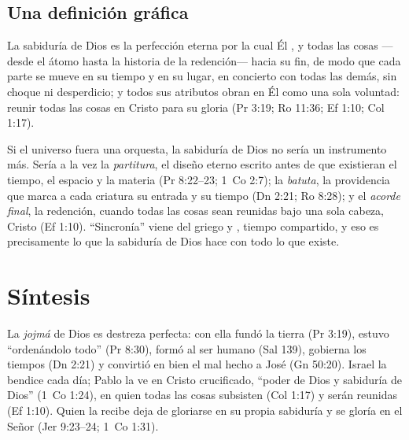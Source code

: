 
\subsection{Una definición gráfica}

\begin{tcolorbox}[colback=papiro,colframe=azul,boxrule=1pt,arc=3pt]
La sabiduría de Dios es la perfección eterna por la cual Él ,  y  todas las cosas ---desde el átomo hasta la historia de la redención--- hacia su fin, de modo que cada parte se mueve en su tiempo y en su lugar, en concierto con todas las demás, sin choque ni desperdicio; y todos sus atributos obran en Él como una sola voluntad: reunir todas las cosas en Cristo para su gloria (Pr 3:19; Ro 11:36; Ef 1:10; Col 1:17).
\end{tcolorbox}

Si el universo fuera una orquesta, la sabiduría de Dios no sería un instrumento más. Sería a la vez la \emph{partitura}, el diseño eterno escrito antes de que existieran el tiempo, el espacio y la materia (Pr 8:22--23; 1~Co 2:7); la \emph{batuta}, la providencia que marca a cada criatura su entrada y su tiempo (Dn 2:21; Ro 8:28); y el \emph{acorde final}, la redención, cuando todas las cosas sean reunidas bajo una sola cabeza, Cristo (Ef 1:10). ``Sincronía'' viene del griego  y , tiempo compartido, y eso es precisamente lo que la sabiduría de Dios hace con todo lo que existe.

\section{Síntesis}

\begin{tcolorbox}[colback=papiro,colframe=azul,boxrule=1pt,arc=3pt]
La \emph{jojmá} de Dios es destreza perfecta: con ella fundó la tierra (Pr 3:19), estuvo ``ordenándolo todo'' (Pr 8:30), formó al ser humano (Sal 139), gobierna los tiempos (Dn 2:21) y convirtió en bien el mal hecho a José (Gn 50:20). Israel la bendice cada día; Pablo la ve en Cristo crucificado, ``poder de Dios y sabiduría de Dios'' (1~Co 1:24), en quien todas las cosas subsisten (Col 1:17) y serán reunidas (Ef 1:10). Quien la recibe deja de gloriarse en su propia sabiduría y se gloría en el Señor (Jer 9:23--24; 1~Co 1:31).
\end{tcolorbox}

